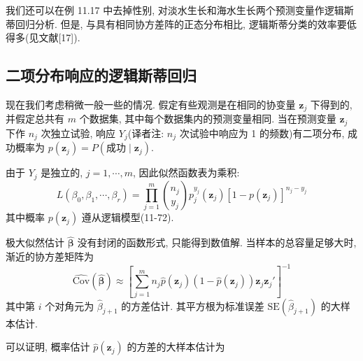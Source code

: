我们还可以在例 11.17 中去掉性别, 对淡水生长和海水生长两个预测变量作逻辑斯蒂回归分析. 但是, 与具有相同协方差阵的正态分布相比, 逻辑斯蒂分类的效率要低得多(见文献[17]).

\subsection{二项分布响应的逻辑斯蒂回归}

现在我们考虑稍微一般一些的情况. 假定有些观测是在相同的协变量 $\mathbf{z}_j$ 下得到的, 并假定总共有 $m$ 个数据集, 其中每个数据集内的预测变量相同. 当在预测变量 $\mathbf{z}_j$ 下作 $n_j$ 次独立试验, 响应 $Y_j$(译者注: $n_j$ 次试验中响应为 1 的频数)有二项分布, 成功概率为 $p(\mathbf{z}_j)=P(\text{成功}\mid \mathbf{z}_j)$.

由于 $Y_j$ 是独立的, $j=1,\cdots,m$, 因此似然函数表为乘积:
\label{eq:11-78}
\begin{equation}
L(\beta_0,\beta_1,\cdots,\beta_r)=\prod_{j=1}^{m}\binom{n_j}{y_j}p_j^{y_j}(\mathbf{z}_j)[1-p(\mathbf{z}_j)]^{n_j-y_j}
\tag{11-78}
\end{equation}
其中概率 $p(\mathbf{z}_j)$ 遵从逻辑模型(11-72).

极大似然估计 $\hat{\boldsymbol{\beta}}$ 没有封闭的函数形式, 只能得到数值解. 当样本的总容量足够大时, 渐近的协方差矩阵为
\label{eq:11-79}
\begin{equation}
\widehat{\mathrm{Cov}}(\hat{\boldsymbol{\beta}})\approx\left[\sum_{j=1}^{m}n_j\hat{p}(\mathbf{z}_j)(1-\hat{p}(\mathbf{z}_j))\mathbf{z}_j\mathbf{z}_j'\right]^{-1}
\tag{11-79}
\end{equation}
其中第 $i$ 个对角元为 $\hat{\beta}_{j+1}$ 的方差估计. 其平方根为标准误差 $\mathrm{SE}(\hat{\beta}_{j+1})$ 的大样本估计.

可以证明, 概率估计 $\hat{p}(\mathbf{z}_j)$ 的方差的大样本估计为
